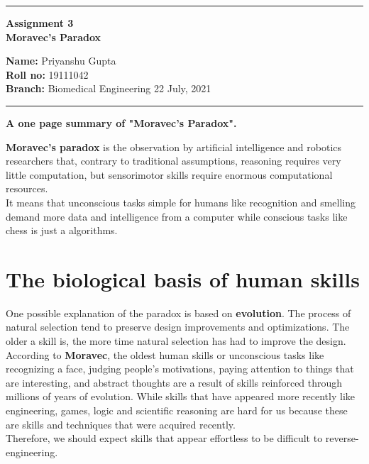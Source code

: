 \documentclass[10pt,a4paper,twoside]{article}
\begin{document}
\begin{center}
\hrule

\vspace{.3cm}
{\bf {\Large Assignment 3 }}\\
{\bf {\huge Moravec's Paradox}}
\vspace{.2cm}
\end{center}
{\bf Name:}  Priyanshu Gupta\\
{\bf Roll no:}  19111042 \\
{\bf Branch: }  Biomedical Engineering \hspace{\fill}  22 July, 2021 \\
\hrule

\vspace{.4cm}
\begin{center}
{\textbf{\large A one page summary of "Moravec's Paradox".}} \\
\end{center}
\textbf{Moravec's paradox} is the observation by artificial intelligence and robotics researchers that, contrary to traditional assumptions, reasoning requires very little computation, but sensorimotor skills require enormous computational resources. \\
It means that unconscious tasks simple for humans like recognition and smelling demand more data and intelligence from a computer while conscious tasks like chess is just a algorithms. 
 

\section*{The biological basis of human skills}
One possible explanation of the paradox is based on \textbf{evolution}. The process of natural selection tend to preserve design improvements and optimizations. The older a skill is, the more time natural selection has had to improve the design. \\
According to \textbf{Moravec}, the oldest human skills or unconscious tasks like recognizing a face, judging people's motivations, paying attention to things that are interesting, and abstract thoughts are a result of skills reinforced through millions of years of evolution. While skills that have appeared more recently like engineering, games, logic and scientific reasoning are hard for us because these are skills and techniques that were acquired recently.\\
Therefore, we should expect skills that appear effortless to be difficult to reverse-engineering.
\end{document}
